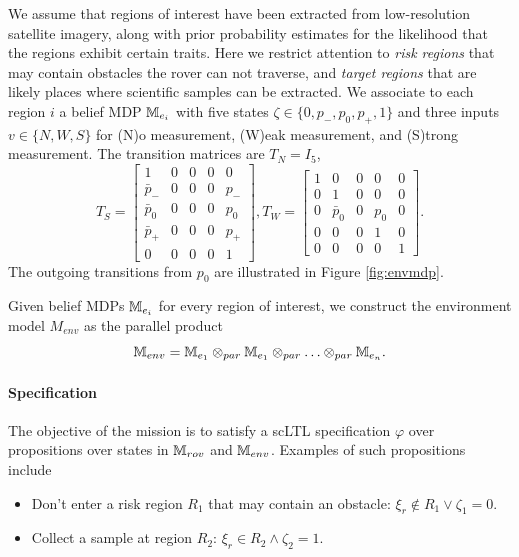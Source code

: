 \documentclass[conference]{IEEEtran}
\begin{document}
We assume that regions of interest have been extracted from low-resolution satellite imagery, along with prior probability estimates for the likelihood that the regions exhibit certain traits. Here we restrict attention to \emph{risk regions} that may contain obstacles the rover can not traverse, and \emph{target regions} that are likely places where scientific samples can be extracted. We associate to each region $i$ a belief MDP $\mathbb{M}_{e_i}$ with five states $\zeta \in \{ 0, p_-, p_0, p_+, 1\}$ and three inputs $v \in \{ N, W, S \}$ for (N)o measurement, (W)eak measurement, and (S)trong measurement. The transition matrices are $T_N = I_5$, 
\begin{equation}
  T_{S} = \left[\begin{smallmatrix}
    1        &  0  &  0  &  0  &  0   \\
    \bar p_- &  0  &  0  &  0  &  p_- \\
    \bar p_0 &  0  &  0  &  0  &  p_0 \\
    \bar p_+ &  0  &  0  &  0  &  p_+ \\
    0        &  0  &  0  &  0  &  1
  \end{smallmatrix}\right],
  T_{W} = \left[\begin{smallmatrix}
    1        &  0                &  0  &  0           &  0   \\
    0        &  1                &  0  &  0           &  0 \\
    0        &  \bar p_0         &  0  & p_0          &  0\\
    0        &  0                &  0  &  1           &  0 \\
    0        &  0  &  0  &  0  &  1
  \end{smallmatrix}\right].
\end{equation}
The outgoing transitions from $p_0$ are illustrated in Figure \ref{fig:envmdp}.

Given belief MDPs $\mathbb{M}_{e_i}$ for every region of interest, we construct the environment model $M_{env}$ as the parallel product
\begin{equation}
  \mathbb{M}_{env} = \mathbb{M}_{e_1} \otimes_{par} \mathbb{M}_{e_1}  \otimes_{par} \ldots \otimes_{par} \mathbb{M}_{e_n}. 
\end{equation}

\paragraph{Specification}

The objective of the mission is to satisfy a scLTL specification $\varphi$ over propositions over states in $\mathbb{M}_{rov}$ and $\mathbb{M}_{env}$. Examples of such propositions include
\begin{itemize}
  \item Don't enter a risk region $R_1$ that may contain an obstacle: $\xi_r \not  \in R_1 \lor \zeta_1 = 0$.
  \item Collect a sample at region $R_2$: $\xi_r \in R_2 \land \zeta_2 = 1$.
\end{itemize}
\end{document}
